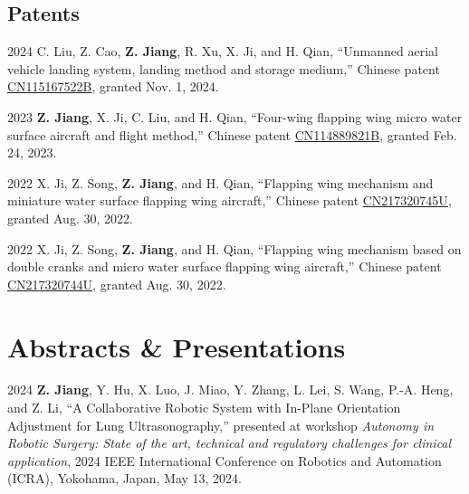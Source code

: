\documentclass[11pt,letterpaper]{report}
\begin{document}
\subsection*{Patents}
\begin{tablist}	
	\item[2024]   \tab{}C. Liu, Z. Cao, \textbf{Z. Jiang}, R. Xu, X. Ji, and H. Qian, ``Unmanned aerial vehicle landing system, landing method and storage medium,'' Chinese patent \href{https://patents.google.com/patent/CN115167522A/en?oq=CN115167522A}{CN115167522B}, granted Nov. 1, 2024.	
		
	\item[2023]   \tab{}\textbf{Z. Jiang}, X. Ji, C. Liu, and H. Qian, ``Four-wing flapping wing micro water surface aircraft and flight method,'' Chinese patent \href{https://patents.google.com/patent/CN114889821B/en?oq=CN114889821B}{CN114889821B}, granted Feb. 24, 2023.
		
	\item[2022]   \tab{}X. Ji, Z. Song, \textbf{Z. Jiang}, and H. Qian, ``Flapping wing mechanism and miniature water surface flapping wing aircraft,'' Chinese patent \href{https://patents.google.com/patent/CN217320745U/en?oq=CN217320745U}{CN217320745U}, granted Aug. 30, 2022.  
		
	\item[2022]   \tab{}X. Ji, Z. Song, \textbf{Z. Jiang}, and H. Qian, ``Flapping wing mechanism based on double cranks and micro water surface flapping wing aircraft,'' Chinese patent \href{https://patents.google.com/patent/CN217320744U/en?oq=CN217320744U}{CN217320744U}, granted Aug. 30, 2022.  
\end{tablist}
	
	
	
\section*{Abstracts \& Presentations}
\begin{tablist}	
	\item[2024] \tab \textbf{Z. Jiang}, Y. Hu, X. Luo, J. Miao, Y. Zhang, L. Lei, S. Wang, P.-A. Heng, and Z. Li, ``A Collaborative Robotic System with In-Plane Orientation Adjustment for Lung Ultrasonography,'' presented at workshop \textit{Autonomy in Robotic Surgery: State of the art, technical and regulatory challenges for clinical application}, 2024 IEEE International Conference on Robotics and Automation (ICRA), Yokohama, Japan, May 13, 2024.
\end{tablist}
	
\end{document}
